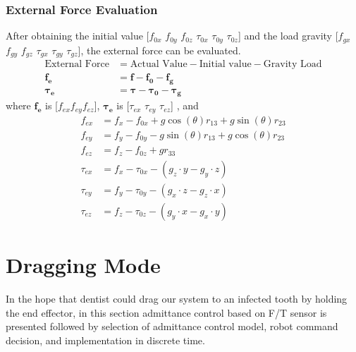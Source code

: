 \subsubsection{External Force Evaluation}
\hspace{6mm}After obtaining the initial value [$f_{0x}$ $f_{0y}$ $f_{0z}$ $\tau_{0x}$ $\tau_{0y}$ $\tau_{0z}$] and the load gravity [$f_{gx}$ $f_{gy}$ $f_{gz}$ $\tau_{gx}$ $\tau_{gy}$ $\tau_{gz}$], the external force can be evaluated.
\begin{equation}
\begin{split}
\text{External Force}	&= \text{Actual Value} 	-\text{Initial value}	-\text{Gravity Load}\\
\boldsymbol{f_e}		&= \boldsymbol{f}		-\boldsymbol{f_0}		-\boldsymbol{f_g}\\ 
\boldsymbol{\tau_e}		&= \boldsymbol{\tau}	-\boldsymbol{\tau_0}	-\boldsymbol{\tau_g}		
\end{split}
\end{equation}
where $\boldsymbol{f_e}$ is [$f_{ex} f_{ey} f_{ez}$], $\boldsymbol{\tau_e}$ is [$\tau_{ex}$ $\tau_{ey}$ $\tau_{ez}$] , and 
\begin{equation}
\begin{split}
f_{ex} &= f_x - f_{0x} 	+ g\cos(\theta)r_{13} 	+ g\sin(\theta)r_{23}\\
f_{ey} &= f_y - f_{0y} 	- g\sin(\theta)r_{13} 	+ g\cos(\theta)r_{23}\\
f_{ez} &= f_z - f_{0z} 	+ gr_{33}\\
\tau_{ex} &= f_x - \tau_{0x} - \left( g_z\cdot y - g_y\cdot z \right)\\
\tau_{ey} &= f_y - \tau_{0y} - \left( g_x\cdot z - g_z\cdot x \right)\\
\tau_{ez} &= f_z - \tau_{0z} - \left( g_y\cdot x - g_x\cdot y \right)
\end{split}
\end{equation}
\section{Dragging Mode}
\hspace*{6mm}In the hope that dentist could drag our system to an infected tooth by holding the end effector, in this section admittance control based on F/T sensor is presented followed by selection of admittance control model, robot command decision, and implementation in discrete time.
